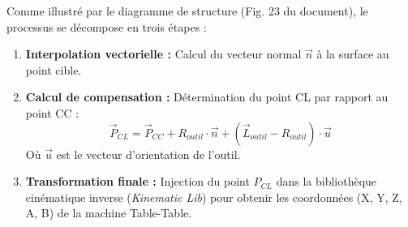 Comme illustré par le diagramme de structure (Fig. 23 du document), le processus se décompose en trois étapes :
\begin{enumerate}
    \item \textbf{Interpolation vectorielle :} Calcul du vecteur normal $\vec{n}$ à la surface au point cible.
    \item \textbf{Calcul de compensation :} Détermination du point CL par rapport au point CC :
    \begin{equation}
        \vec{P}_{CL} = \vec{P}_{CC} + R_{outil} \cdot \vec{n} + (\vec{L}_{outil} - R_{outil}) \cdot \vec{u}
    \end{equation}
    Où $\vec{u}$ est le vecteur d'orientation de l'outil.
    \item \textbf{Transformation finale :} Injection du point $P_{CL}$ dans la bibliothèque cinématique inverse (\textit{Kinematic Lib}) pour obtenir les coordonnées (X, Y, Z, A, B) de la machine Table-Table.
\end{enumerate}


